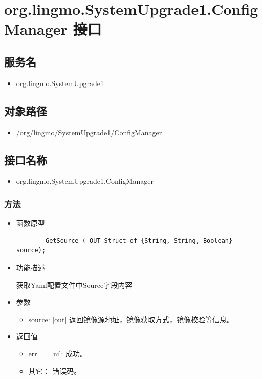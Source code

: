 \documentclass{utart}
\begin{document}
\section{org.lingmo.SystemUpgrade1.ConfigManager 接口}
\subsection{服务名}
\begin{itemize}
    \item org.lingmo.SystemUpgrade1
\end{itemize}

\subsection{对象路径}
\begin{itemize}
    \item /org/lingmo/SystemUpgrade1/ConfigManager
\end{itemize}

\subsection{接口名称}
\begin{itemize}
    \item org.lingmo.SystemUpgrade1.ConfigManager
\end{itemize}

\subsubsection{方法}
\begin{itemize}
    \item 函数原型
    
    \begin{verbatim}
        GetSource ( OUT Struct of {String, String, Boolean} source);
      \end{verbatim}
    \item 功能描述
    
    获取Yaml配置文件中Source字段内容
    \item 参数
      \begin{itemize}
          \item source: [out] 返回镜像源地址，镜像获取方式，镜像校验等信息。
      \end{itemize}
    \item 返回值
      \begin{itemize}
          \item err == nil: 成功。
          \item 其它： 错误码。
      \end{itemize}
\end{itemize}
\end{document}
